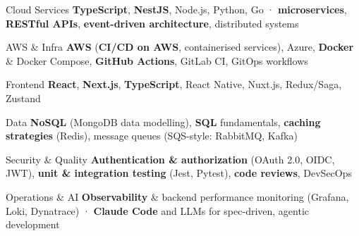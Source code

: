
\begin{cvskills}

  \cvskill
  {Cloud Services}
  {\textbf{TypeScript}, \textbf{NestJS}, Node.js, Python, Go · \textbf{microservices}, \textbf{RESTful APIs}, \textbf{event-driven architecture}, distributed systems}

  \cvskill
  {AWS \& Infra}
  {\textbf{AWS} (\textbf{CI/CD on AWS}, containerised services), Azure, \textbf{Docker} \& Docker Compose, \textbf{GitHub Actions}, GitLab CI, GitOps workflows}

  \cvskill
  {Frontend}
  {\textbf{React}, \textbf{Next.js}, \textbf{TypeScript}, React Native, Nuxt.js, Redux/Saga, Zustand}

  \cvskill
  {Data}
  {\textbf{NoSQL} (MongoDB data modelling), \textbf{SQL} fundamentals, \textbf{caching strategies} (Redis), message queues (SQS-style: RabbitMQ, Kafka)}

  \cvskill
  {Security \& Quality}
  {\textbf{Authentication \& authorization} (OAuth 2.0, OIDC, JWT), \textbf{unit \& integration testing} (Jest, Pytest), \textbf{code reviews}, DevSecOps}

  \cvskill
  {Operations \& AI}
  {\textbf{Observability} \& backend performance monitoring (Grafana, Loki, Dynatrace) · \textbf{Claude Code} and LLMs for spec-driven, agentic development}

\end{cvskills}
